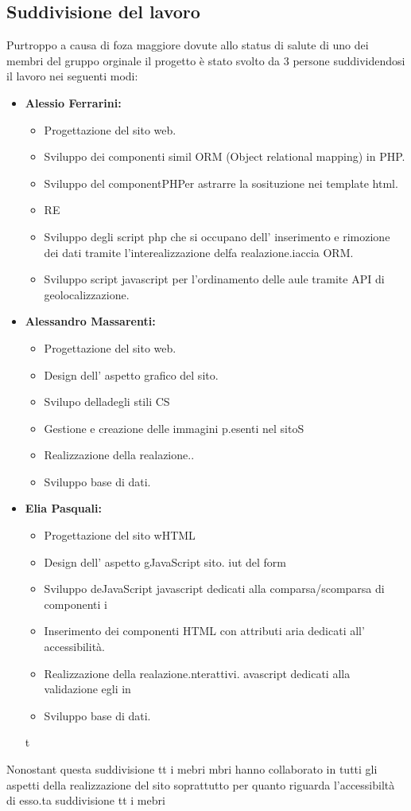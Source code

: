 \subsection{Suddivisione del lavoro}
Purtroppo a causa di foza maggiore dovute allo status di salute di uno dei membri del gruppo orginale il progetto è stato svolto da 3 persone suddividendosi il lavoro nei seguenti modi:
\begin{itemize}
    \item \textbf{Alessio Ferrarini:}
        \begin{itemize}
            \item Progettazione del sito web.
            \item Sviluppo dei componenti simil ORM (Object relational mapping) in PHP.
            \item Sviluppo del componentPHPer astrarre la sosituzione nei template html.
            \item RE\item Sviluppo degli script php che si occupano dell' inserimento e rimozione dei dati tramite 
            l'interealizzazione delfa realazione.iaccia ORM.
            \item Sviluppo script javascript per l'ordinamento delle aule tramite API di geolocalizzazione.
        \end{itemize}
    \item \textbf{Alessandro Massarenti:}
        \begin{itemize}
            \item Progettazione del sito web.
            \item Design dell' aspetto grafico del sito.
            \item Svilupo  delladegli stili CS
            \item Gestione e creazione delle immagini p.esenti nel sitoS
            \item Realizzazione della realazione..
            \item Sviluppo base di dati.
        \end{itemize}
    \item \textbf{Elia Pasquali:}
        \begin{itemize}
            \item Progettazione del sito wHTML            \item Design dell' aspetto gJavaScript sito.
iut del form            \item Sviluppo deJavaScript javascript dedicati alla comparsa/scomparsa di componenti i
            \item Inserimento dei componenti HTML con attributi aria dedicati all' accessibilità.
            \item Realizzazione della realazione.nterattivi. avascript dedicati alla validazione  egli in         \item Sviluppo base di dati.
        \end{itemize}
t\end{itemize}
Nonostant questa suddivisione tt i mebri mbri hanno collaborato in tutti gli aspetti della realizzazione del sito soprattutto per quanto riguarda l'accessibiltà di esso.ta suddivisione tt i mebri 